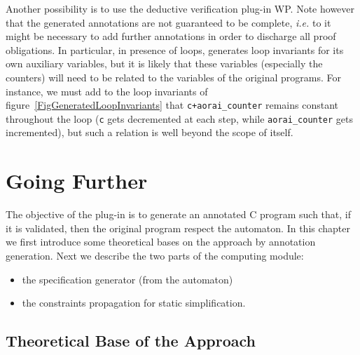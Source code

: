 \documentclass{frama-c-book}
\begin{document}
Another possibility is to use the deductive verification plug-in WP.
Note however that the generated annotations are not guaranteed to be complete,
{\it i.e.} to it might be necessary to add further annotations in order to
discharge all proof obligations. In particular, in presence of loops, \aorai
generates loop invariants for its own auxiliary variables, but it is likely that
these variables (especially the counters) will need to be related to the
variables of the original programs. For instance, we must add to the loop
invariants of figure~\ref{FigGeneratedLoopInvariants} that
\lstinline{c+aorai_counter} remains constant throughout the loop (\lstinline|c|
gets decremented at each step, while \lstinline|aorai_counter| gets
incremented), but such a relation is well beyond the scope of \aorai itself.

\chapter{Going Further}
\label{hackers_guide}
The objective of the \aorai plug-in is to generate an annotated C program such that, if it is validated, then the original program respect the automaton.
In this chapter we first introduce some theoretical bases on the approach by annotation generation. Next we describe the two parts of the computing module:
\begin{itemize}
  \item the specification generator (from the automaton)
  \item the constraints propagation for static simplification.
\end{itemize}

\section{Theoretical Base of the Approach}
\end{document}
